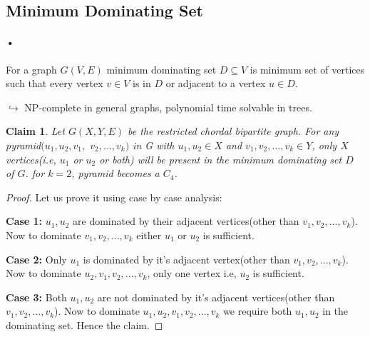 \documentclass[11pt]{article}
\newtheorem{claim}{Claim}
\begin{document}
\subsection{Minimum Dominating Set}
\paragraph{•}
For a graph $G(V,E)$ minimum dominating set $D \subseteq V$ is minimum set of vertices such that every vertex $v \in V$ is in $D$ or adjacent to a vertex $u \in D$. \par
$\hookrightarrow$ NP-complete in general graphs, polynomial time solvable in trees. \medskip
%
%
\begin{claim} \label{dom set for pyramid}
Let $G(X,Y,E)$ be the restricted chordal bipartite graph. For any pyramid$(u_1,u_2,v_1,$ $v_2,...,v_k)$ in G with $u_1,u_2 \in X$ and $v_1,v_2,...,v_k \in Y$, only $X$ vertices(i.e, $u_1$ or $u_2$ or both) will be present in the minimum dominating set $D$ of $G$. for $k=2$, pyramid becomes a $C_4$.
\end{claim}

\begin{center}
\end{center}
\begin{proof}
Let us prove it using case by case analysis:

\textbf{Case 1:} $u_1,u_2$ are dominated by their adjacent vertices(other than $v_1,v_2,...,v_k$). Now to dominate $v_1,v_2,...,v_k$ either $u_1$ or $u_2$ is sufficient. \medskip

\textbf{Case 2:} Only $u_1$ is dominated by it's adjacent vertex(other than $v_1,v_2,...,v_k$). Now to dominate $u_2,v_1,v_2,...,v_k$, only one vertex i.e, $u_2$ is sufficient. \medskip

\textbf{Case 3:} Both $u_1,u_2$ are not dominated by it's adjacent vertices(other than $v_1,v_2,...,v_k$). Now to dominate $u_1,u_2,v_1,v_2,...,v_k$ we require both $u_1,u_2$ in the dominating set. Hence the claim. 
\end{proof}
\end{document}
